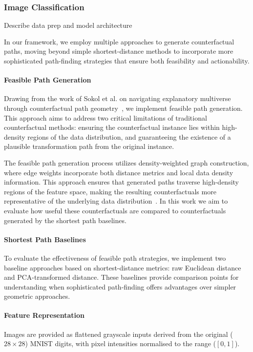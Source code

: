 
\subsubsection{Image Classification}
Describe data prep and model architecture


In our framework, we employ multiple approaches to generate counterfactual paths, moving beyond simple shortest-distance methods to incorporate more sophisticated path-finding strategies that ensure both feasibility and actionability. 

\paragraph{Feasible Path Generation}
Drawing from the work of Sokol et al. on navigating explanatory multiverse through counterfactual path geometry~\cite{sokol2023navigating}, we implement feasible path generation. This approach aims to address two critical limitations of traditional counterfactual methods: ensuring the counterfactual instance lies within high-density regions of the data distribution, and guaranteeing the existence of a plausible transformation path from the original instance.

The feasible path generation process utilizes density-weighted graph construction, where edge weights incorporate both distance metrics and local data density information. This approach ensures that generated paths traverse high-density regions of the feature space, making the resulting counterfactuals more representative of the underlying data distribution~\cite{poyiadzi2020face}. In this work we aim to evaluate how useful these counterfactuals are compared to counterfactuals generated by the shortest path baselines.

\paragraph{Shortest Path Baselines}

To evaluate the effectiveness of feasible path strategies, we implement two baseline approaches based on shortest-distance metrics: raw Euclidean distance and PCA-transformed distance. These baselines provide comparison points for understanding when sophisticated path-finding offers advantages over simpler geometric approaches.


\paragraph{Feature Representation}
Images are provided as flattened grayscale inputs derived from the original ($28 \times 28$) MNIST digits, with pixel intensities normalised to the range ($[0, 1]$).

